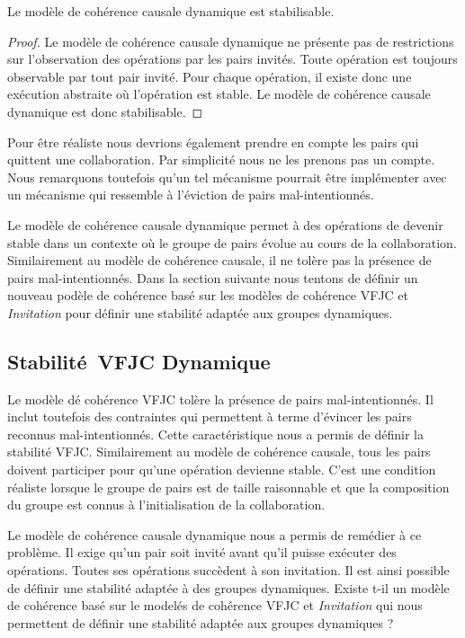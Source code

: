 \begin{theorem}\label{th:stabilizable-dyn-causal}
Le modèle de cohérence causale dynamique est stabilisable.
\end{theorem}

\begin{proof}
Le modèle de cohérence causale dynamique ne présente pas de restrictions sur l'observation des opérations par les pairs invités.
Toute opération est toujours observable par tout pair invité.
Pour chaque opération, il existe donc une exécution abstraite où l'opération est stable.
Le modèle de cohérence causale dynamique est donc stabilisable.
\end{proof}

Pour être réaliste nous devrions également prendre en compte les pairs qui quittent une collaboration.
Par simplicité nous ne les prenons pas un compte.
Nous remarquons toutefois qu'un tel mécanisme pourrait être implémenter avec un mécanisme qui ressemble à l'éviction de pairs mal-intentionnés.

Le modèle de cohérence causale dynamique permet à des opérations de devenir stable dans un contexte où le groupe de pairs évolue au cours de la collaboration.
Similairement au modèle de cohérence causale, il ne tolère pas la présence de pairs mal-intentionnés.
Dans la section suivante nous tentons de définir un nouveau podèle de cohérence basé sur les modèles de cohérence \acs{VFJC} et \emph{Invitation} pour définir une stabilité adaptée aux groupes dynamiques.


\subsection{Stabilité~\acl{VFJC} Dynamique}\label{subsec:dvfjcs}

Le modèle dé cohérence \ac{VFJC} tolère la présence de pairs mal-intentionnés.
Il inclut toutefois des contraintes qui permettent à terme d'évincer les pairs reconnus mal-intentionnés.
Cette caractéristique nous a permis de définir la stabilité \ac{VFJC}.
Similairement au modèle de cohérence causale, tous les pairs doivent participer pour qu'une opération devienne stable.
C'est une condition réaliste lorsque le groupe de pairs est de taille raisonnable et que la composition du groupe est connus à l'initialisation de la collaboration.

Le modèle de cohérence causale dynamique nous a permis de remédier à ce problème.
Il exige qu'un pair soit invité avant qu'il puisse exécuter des opérations.
Toutes ses opérations succèdent à son invitation.
Il est ainsi possible de définir une stabilité adaptée à des groupes dynamiques.
Existe t-il un modèle de cohérence basé sur le modelés de cohérence \acs{VFJC} et \emph{Invitation} qui nous permettent de définir une stabilité adaptée aux groupes dynamiques ?

